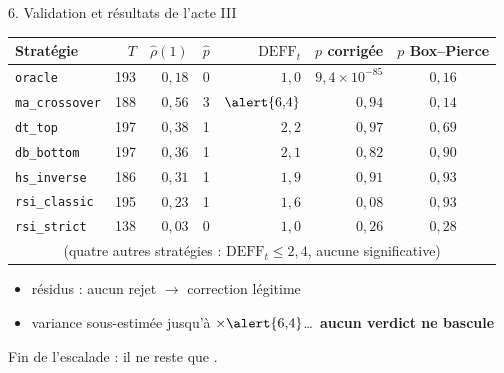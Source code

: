 \documentclass[10pt]{beamer}
\begin{document}
\begin{frame}{6. Validation et résultats de l'acte III}
  \begin{center}
  \footnotesize
  \begin{tabular}{@{}lrrrrrc@{}}
    \toprule
    Stratégie & $T$ & $\hat\rho(1)$ & $\hat p$ & $\mathrm{DEFF}_t$ &
      $p$ corrigée & $p$ Box--Pierce \\
    \midrule
    \texttt{oracle}        & 193 & $0{,}18$ & 0 & $1{,}0$ & $9{,}4\times10^{-85}$ & $0{,}16$ \\
    \midrule
    \texttt{ma\_crossover} & 188 & $0{,}56$ & 3 & $\alert{6{,}4}$ & $0{,}94$ & $0{,}14$ \\
    \texttt{dt\_top}       & 197 & $0{,}38$ & 1 & $2{,}2$ & $0{,}97$ & $0{,}69$ \\
    \texttt{db\_bottom}    & 197 & $0{,}36$ & 1 & $2{,}1$ & $0{,}82$ & $0{,}90$ \\
    \texttt{hs\_inverse}   & 186 & $0{,}31$ & 1 & $1{,}9$ & $0{,}91$ & $0{,}93$ \\
    \texttt{rsi\_classic}  & 195 & $0{,}23$ & 1 & $1{,}6$ & $0{,}08$ & $0{,}93$ \\
    \texttt{rsi\_strict}   & 138 & $0{,}03$ & 0 & $1{,}0$ & $0{,}26$ & $0{,}28$ \\
    \multicolumn{7}{c}{\scriptsize (quatre autres stratégies :
      $\mathrm{DEFF}_t \le 2{,}4$, aucune significative)} \\
    \bottomrule
  \end{tabular}
  \end{center}
  \vspace{4mm}
  \begin{itemize}\setlength{\itemsep}{3mm}
    \item résidus : aucun rejet $\to$ correction légitime
    \item variance sous-estimée jusqu'à $\times\alert{6{,}4}$\ldots\
      \textbf{aucun verdict ne bascule}
  \end{itemize}
  \vspace{2mm}
  \begin{block}{}
    Fin de l'escalade : il ne reste que .
  \end{block}
\end{frame}
\end{document}
